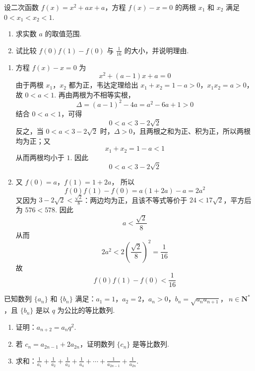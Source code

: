 \begin{problem}
设二次函数 \( f(x) = x^{2} + ax + a \)，方程 \( f(x) - x = 0 \) 的两根 \( x_{1} \) 和 \( x_{2} \) 满足 \( 0 < x_{1} < x_{2} < 1 \).
\begin{enumerate}
\item 求实数 \(a\) 的取值范围.
\item 试比较 \( f(0)f(1) - f(0) \) 与 \( \frac{1}{16} \) 的大小，并说明理由.
\end{enumerate}
\end{problem}

\begin{solution}
\begin{enumerate}
\item
方程 \(f(x)-x=0\) 为
\[
x^2+(a-1)x+a=0
\]
由于两根 \(x_1\)，\(x_2\) 都为正，韦达定理给出
\(x_1+x_2=1-a>0\)，\(x_1x_2=a>0\)，
故 \(0<a<1\). 再由两根为不相等实根，
\[
\Delta=(a-1)^2-4a=a^2-6a+1>0
\]
结合 \(0<a<1\)，可得
\[
0<a<3-2\sqrt2
\]
反之，当 \(0<a<3-2\sqrt2\) 时，\(\Delta>0\)，且两根之和为正、积为正，所以两根均为正；又
\[
x_1+x_2=1-a<1
\]
从而两根均小于 \(1\). 因此
\[
0<a<3-2\sqrt2
\]
\item
又
\(f(0)=a\)，\(f(1)=1+2a\)，
所以
\[
f(0)f(1)-f(0)=a(1+2a)-a=2a^2
\]
又因为 \(3-2\sqrt2<\frac{\sqrt2}{8}\)：两边均为正，且该不等式等价于 \(24<17\sqrt2\)，平方后为 \(576<578\). 因此
\[
a<\frac{\sqrt2}{8}
\]
从而
\[
2a^2<2\left(\frac{\sqrt2}{8}\right)^2=\frac1{16}
\]
故
\[
f(0)f(1)-f(0)<\frac1{16}
\]
\end{enumerate}
\end{solution}

\begin{problem}
已知数列 \(\{a_{n}\}\) 和 \(\{b_{n}\}\) 满足：\(a_{1} = 1\)，\(a_{2} = 2\)，\(a_{n} > 0\)，\(b_{n} = \sqrt{a_{n}a_{n + 1}}\)，\(\ n \in \mathbf{N}^{*}\)，且 \(\{b_{n}\}\) 是以 \(q\) 为公比的等比数列.
\begin{enumerate}
\item 证明：\( a_{n+2}=a_{n}q^{2} \).
\item 若 \(c_{n} = a_{2n - 1} + 2a_{2n}\)，证明数列 \(\{c_{n}\}\) 是等比数列.
\item 求和：\(\frac{1}{a_1} + \frac{1}{a_2} + \frac{1}{a_3} + \frac{1}{a_4} + \cdots + \frac{1}{a_{2n-1}} + \frac{1}{a_{2n}}\).
\end{enumerate}
\end{problem}

